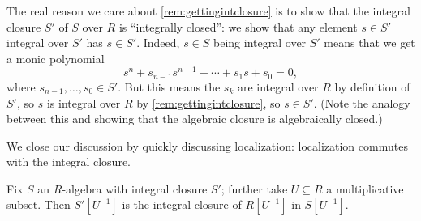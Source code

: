 \begin{remark}[Nir]
	The real reason we care about \autoref{rem:gettingintclosure} is to show that the integral closure $S'$ of $S$ over $R$ is ``integrally closed'': we show that any element $s\in S'$ integral over $S'$ has $s\in S'$. Indeed, $s\in S$ being integral over $S'$ means that we get a monic polynomial
	\[s^n+s_{n-1}s^{n-1}+\cdots+s_1s+s_0=0,\]
	where $s_{n-1},\ldots,s_0\in S'$. But this means the $s_k$ are integral over $R$ by definition of $S'$, so $s$ is integral over $R$ by \autoref{rem:gettingintclosure}, so $s\in S'$. (Note the analogy between this and showing that the algebraic closure is algebraically closed.)
\end{remark}
We close our discussion by quickly discussing localization: localization commutes with the integral closure.
\begin{proposition}
	Fix $S$ an $R$-algebra with integral closure $S'$; further take $U\subseteq R$ a multiplicative subset. Then $S'\left[U^{-1}\right]$ is the integral closure of $R\left[U^{-1}\right]$ in $S\left[U^{-1}\right]$.
\end{proposition}
